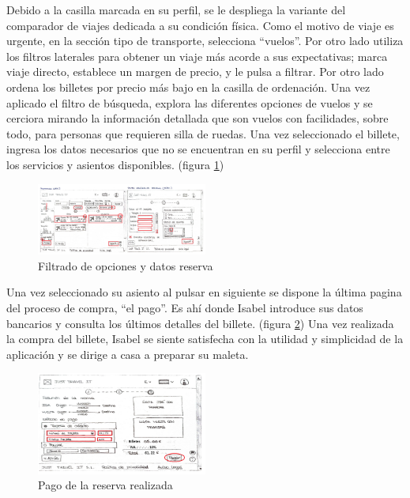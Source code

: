 Debido a la casilla marcada en su perfil, se le despliega la variante del comparador de viajes dedicada a su condición física. Como el motivo de viaje es urgente, en la sección tipo de transporte, selecciona “vuelos”. Por otro lado utiliza los filtros laterales para obtener un viaje más acorde a sus expectativas; marca viaje directo, establece un margen de precio, y le pulsa a filtrar. Por otro lado ordena los billetes por precio más bajo en la casilla de ordenación.
Una vez aplicado el filtro de búsqueda, explora las diferentes opciones de vuelos y se cerciora mirando la información detallada que son vuelos con facilidades, sobre todo, para personas que requieren silla de ruedas.
Una vez seleccionado el billete, ingresa los datos necesarios que no se encuentran en su perfil y selecciona entre los servicios y asientos disponibles. (figura \ref{fig:Isabel3})
\begin{figure}[h]
    \centering
    \includegraphics[width=0.5\textwidth]{Imagenes/Keypath/Isabel3.png}
    \caption{Filtrado de opciones y datos reserva}
    \label{fig:Isabel3}
\end{figure}

Una vez seleccionado su asiento al pulsar en siguiente se dispone la última pagina del proceso de compra, “el pago”. Es ahí donde Isabel introduce sus datos bancarios 
y consulta los últimos detalles del billete. (figura \ref{fig:Isabel4}) Una vez realizada la compra del billete, Isabel se siente satisfecha con la utilidad y simplicidad de la aplicación y 
se dirige a casa a preparar su maleta.
\begin{figure}[h]
    \centering
    \includegraphics[width=0.5\textwidth]{Imagenes/Keypath/Isabel4.png}
    \caption{Pago de la reserva realizada}
    \label{fig:Isabel4}
\end{figure}


